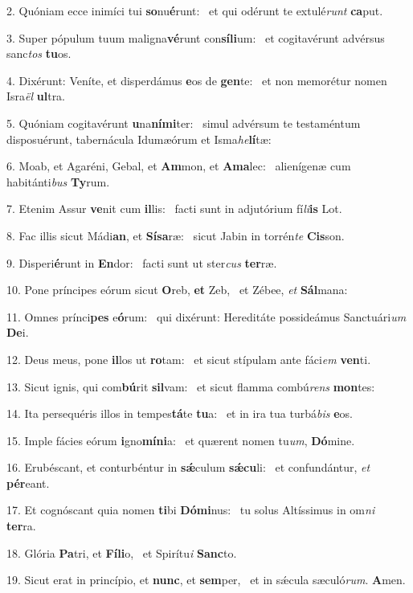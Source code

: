 2. Quóniam ecce inimíci tui \textbf{so}nu\textbf{é}runt: \ast\  et qui odérunt te extulé\textit{runt} \textbf{ca}put.\

3. Super pópulum tuum maligna\textbf{vé}runt con\textbf{sí}\textbf{li}um: \ast\  et cogitavérunt advérsus sanc\textit{tos} \textbf{tu}os.\

4. Dixérunt: Veníte, et disperdámus \textbf{e}os de \textbf{gen}te: \ast\  et non memorétur nomen Isra\textit{ël} \textbf{ul}tra.\

5. Quóniam cogitavérunt \textbf{u}na\textbf{ní}\textbf{mi}ter: \ast\  simul advérsum te testaméntum disposuérunt, tabernácula Idumæórum et Isma\textit{he}\textbf{lí}tæ:\

6. Moab, et Agaréni, Gebal, et \textbf{Am}mon, et \textbf{A}\textbf{ma}lec: \ast\  alienígenæ cum habitánti\textit{bus} \textbf{Ty}rum.\

7. Etenim Assur \textbf{ve}nit cum \textbf{il}lis: \ast\  facti sunt in adjutórium fí\textit{li}\textbf{is} Lot.\

8. Fac illis sicut Mádi\textbf{an}, et \textbf{Sí}\textbf{sa}ræ: \ast\  sicut Jabin in torrén\textit{te} \textbf{Cis}son.\

9. Disperi\textbf{é}runt in \textbf{En}dor: \ast\  facti sunt ut ster\textit{cus} \textbf{ter}ræ.\

10. Pone príncipes eórum sicut \textbf{O}reb, \textbf{et} Zeb, \ast\  et Zébee, \textit{et} \textbf{Sál}mana:\

11. Omnes prínci\textbf{pes} e\textbf{ó}rum: \ast\  qui dixérunt: Hereditáte possideámus Sanctuári\textit{um} \textbf{De}i.\

12. Deus meus, pone \textbf{il}los ut \textbf{ro}tam: \ast\  et sicut stípulam ante fáci\textit{em} \textbf{ven}ti.\

13. Sicut ignis, qui com\textbf{bú}rit \textbf{sil}vam: \ast\  et sicut flamma combú\textit{rens} \textbf{mon}tes:\

14. Ita persequéris illos in tempes\textbf{tá}te \textbf{tu}a: \ast\  et in ira tua turbá\textit{bis} \textbf{e}os.\

15. Imple fácies eórum \textbf{i}gno\textbf{mí}\textbf{ni}a: \ast\  et quærent nomen tu\textit{um}, \textbf{Dó}mine.\

16. Erubéscant, et conturbéntur in \textbf{sǽ}culum \textbf{sǽ}\textbf{cu}li: \ast\  et confundántur, \textit{et} \textbf{pér}eant.\

17. Et cognóscant quia nomen \textbf{ti}bi \textbf{Dó}\textbf{mi}nus: \ast\  tu solus Altíssimus in om\textit{ni} \textbf{ter}ra.\

18. Glória \textbf{Pa}tri, et \textbf{Fí}\textbf{li}o, \ast\  et Spirítu\textit{i} \textbf{Sanc}to.\

19. Sicut erat in princípio, et \textbf{nunc}, et \textbf{sem}per, \ast\  et in sǽcula sæculó\textit{rum}. \textbf{A}men.\

